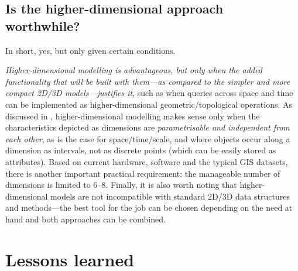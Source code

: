 
\subsection*{Is the higher-dimensional approach worthwhile?}

In short, yes, but only given certain conditions.

\emph{Higher-dimensional modelling is advantageous, but only when the added functionality that will be built with them---as compared to the simpler and more compact 2D/3D models---justifies it}, such as when queries across space and time can be implemented as higher-dimensional geometric/topological operations.
As discussed in , higher-dimensional modelling makes sense only when the characteristics depicted as dimensions are \emph{parametrisable and independent from each other}, as is the case for space/time/scale, and where objects occur along a dimension as intervals, not as discrete points (which can be easily stored as attributes).
Based on current hardware, software and the typical GIS datasets, there is another important practical requirement: the manageable number of dimensions is limited to 6--8.
Finally, it is also worth noting that higher-dimensional models are not incompatible with standard 2D/3D data structures and methods---the best tool for the job can be chosen depending on the need at hand and both approaches can be combined.

\section{Lessons learned}
\label{se:conclusions}


